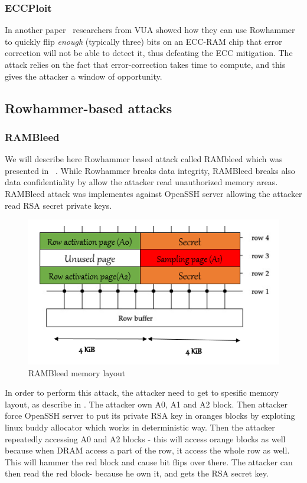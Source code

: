 \subsubsection{ECCPloit}\label{subsubsec:eccploit}
In another paper~\cite{eccploit} researchers from VUA showed how they can use
Rowhammer to quickly flip \emph{enough} (typically three) bits on an ECC-RAM
chip that error correction will not be able to detect it, thus defeating the ECC
mitigation. The attack relies on the fact that error-correction takes time to
compute, and this gives the attacker a window of opportunity.

\subsection{Rowhammer-based attacks}
\subsubsection{RAMBleed}
We will describe here Rowhammer based attack called RAMbleed which was presented in ~\cite{rambleed_paper}. While Rowhammer breaks data integrity, RAMBleed breaks also data confidentiality by allow the attacker read unauthorized memory areas. RAMBleed attack was implementes against OpenSSH server allowing the attacker read RSA secret private keys. 

\begin{figure}[!ht]
	\centering
	\includegraphics[width=0.7\linewidth]{images/chapter_9/rambleed_memory_layout.png}
	\caption{RAMBleed memory layout}
	\label{fig:rambleed_memory_layout}
\end{figure}
In order to perform this attack, the attacker need to get to spesific memory layout, as describe in . The attacker own A0, A1 and A2 block. Then attacker force OpenSSH server to put its private RSA key in oranges blocks by exploting linux buddy allocator which works in deterministic way. Then the attacker repeatedly accessing A0 and A2 blocks - this will access orange blocks 
as well because when DRAM access a part of the row, it access the whole row as well. This will hammer the red block and cause bit flips over there. The attacker can then read the red block- because he own it, and gets the RSA secret key.

